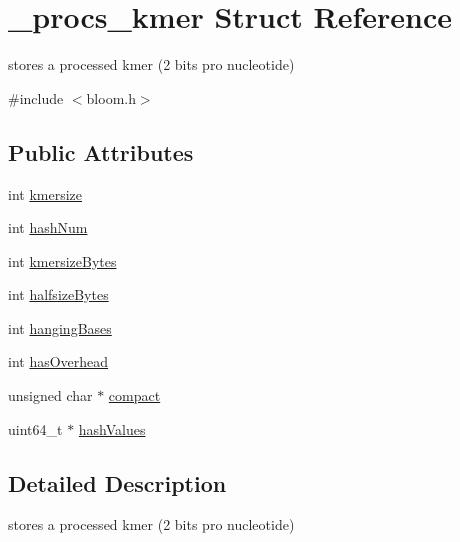 \hypertarget{struct__procs__kmer}{\section{\+\_\+procs\+\_\+kmer Struct Reference}
\label{struct__procs__kmer}
}


stores a processed kmer (2 bits pro nucleotide)  




{\ttfamily \#include $<$bloom.\+h$>$}

\subsection*{Public Attributes}
\begin{DoxyCompactItemize}
\item 
int \hyperlink{struct__procs__kmer_acd250ab75fc47fde7d3e9ff1b2977f14}{kmersize}
\item 
int \hyperlink{struct__procs__kmer_a054cf4233a621787e53874d2c1c4495e}{hash\+Num}
\item 
int \hyperlink{struct__procs__kmer_a0e08c6a8147fb51c5c891e957d5c7c93}{kmersize\+Bytes}
\item 
int \hyperlink{struct__procs__kmer_aa45c7225cd512dec96f9a8745b24c047}{halfsize\+Bytes}
\item 
int \hyperlink{struct__procs__kmer_a39a5e3c54a27bd06061038f8c9628471}{hanging\+Bases}
\item 
int \hyperlink{struct__procs__kmer_a13ad18789320173c1a2ea9c514571cb7}{has\+Overhead}
\item 
unsigned char $\ast$ \hyperlink{struct__procs__kmer_a2a2f8c0b8848d3d908c253e0e57a31ea}{compact}
\item 
uint64\+\_\+t $\ast$ \hyperlink{struct__procs__kmer_ac47c2d17d8a2559b22593e1beb7bb48a}{hash\+Values}
\end{DoxyCompactItemize}


\subsection{Detailed Description}
stores a processed kmer (2 bits pro nucleotide) 

